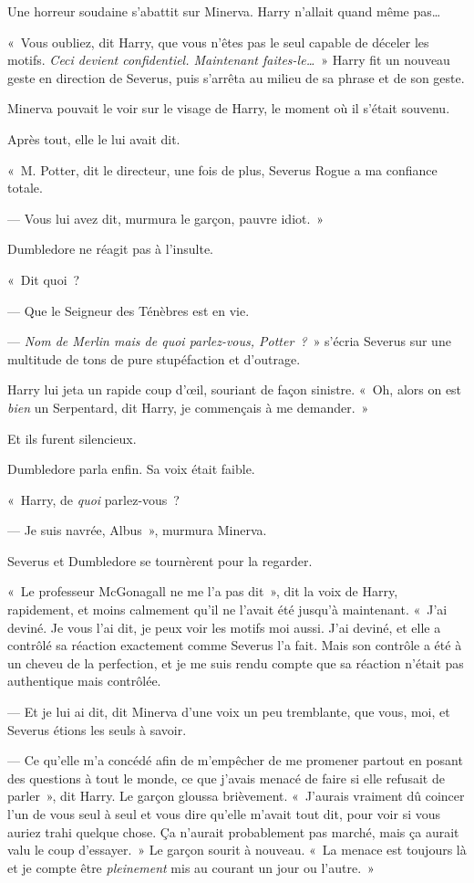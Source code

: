 Une horreur soudaine s'abattit sur Minerva.
Harry n'allait quand même pas…

«~Vous oubliez, dit Harry, que vous n'êtes pas le seul capable de déceler les motifs.
\emph{Ceci devient confidentiel.
Maintenant faites-le…}~» Harry fit un nouveau geste en direction de Severus, puis s'arrêta au milieu de sa phrase et de son geste.

Minerva pouvait le voir sur le visage de Harry, le moment où il s'était souvenu.

Après tout, elle le lui avait dit.

«~M. Potter, dit le directeur, une fois de plus, Severus Rogue a ma confiance totale.

--- Vous lui avez dit, murmura le garçon, pauvre idiot.~»

Dumbledore ne réagit pas à l'insulte.

«~Dit quoi~?

--- Que le Seigneur des Ténèbres est en vie.

--- \emph{Nom de Merlin mais de quoi parlez-vous, Potter~?}~» s'écria Severus sur une multitude de tons de pure stupéfaction et d'outrage.

Harry lui jeta un rapide coup d'œil, souriant de façon sinistre.
«~Oh, alors on est \emph{bien} un Serpentard, dit Harry, je commençais à me demander.~»

Et ils furent silencieux.

Dumbledore parla enfin.
Sa voix était faible.

«~Harry, de \emph{quoi} parlez-vous~?

--- Je suis navrée, Albus~», murmura Minerva.

Severus et Dumbledore se tournèrent pour la regarder.

«~Le professeur McGonagall ne me l'a pas dit~», dit la voix de Harry, rapidement, et moins calmement qu'il ne l'avait été jusqu'à maintenant.
«~J'ai deviné.
Je vous l'ai dit, je peux voir les motifs moi aussi.
J'ai deviné, et elle a contrôlé sa réaction exactement comme Severus l'a fait.
Mais son contrôle a été à un cheveu de la perfection, et je me suis rendu compte que sa réaction n'était pas authentique mais contrôlée.

--- Et je lui ai dit, dit Minerva d'une voix un peu tremblante, que vous, moi, et Severus étions les seuls à savoir.

--- Ce qu'elle m'a concédé afin de m'empêcher de me promener partout en posant des questions à tout le monde, ce que j'avais menacé de faire si elle refusait de parler~», dit Harry.
Le garçon gloussa brièvement.
«~J'aurais vraiment dû coincer l'un de vous seul à seul et vous dire qu'elle m'avait tout dit, pour voir si vous auriez trahi quelque chose.
Ça n'aurait probablement pas marché, mais ça aurait valu le coup d'essayer.~»
Le garçon sourit à nouveau.
«~La menace est toujours là et je compte être \emph{pleinement} mis au courant un jour ou l'autre.~»

